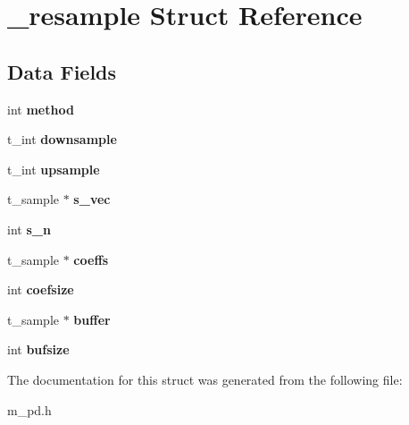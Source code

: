 \hypertarget{struct__resample}{}\section{\+\_\+resample Struct Reference}
\label{struct__resample}
\subsection*{Data Fields}
\begin{DoxyCompactItemize}
\item 
\mbox{\label{struct__resample_adcc9a19ad3119f823a658f6a49a24e64}} 
int {\bfseries method}
\item 
\mbox{\label{struct__resample_a557c02564a918ab46f10edfd7cf58c49}} 
t\+\_\+int {\bfseries downsample}
\item 
\mbox{\label{struct__resample_a8bd5117088d2fe0f7feca9bee53ca183}} 
t\+\_\+int {\bfseries upsample}
\item 
\mbox{\label{struct__resample_ad4ecec8b90444188a47a8cde0babc5ae}} 
t\+\_\+sample $\ast$ {\bfseries s\+\_\+vec}
\item 
\mbox{\label{struct__resample_aee0a45e5329caef59b617145b09fc3fa}} 
int {\bfseries s\+\_\+n}
\item 
\mbox{\label{struct__resample_a9c34ce6a37c6273044bd148d1b7e6298}} 
t\+\_\+sample $\ast$ {\bfseries coeffs}
\item 
\mbox{\label{struct__resample_a8ebe6d92ebeffa641883431e18e5fe2b}} 
int {\bfseries coefsize}
\item 
\mbox{\label{struct__resample_ad3f952f1432d55dde1e47bf4ed4296fb}} 
t\+\_\+sample $\ast$ {\bfseries buffer}
\item 
\mbox{\label{struct__resample_a199ab88d4ca8eab30e1cb7d35edacca5}} 
int {\bfseries bufsize}
\end{DoxyCompactItemize}


The documentation for this struct was generated from the following file\+:\begin{DoxyCompactItemize}
\item 
m\+\_\+pd.\+h\end{DoxyCompactItemize}
